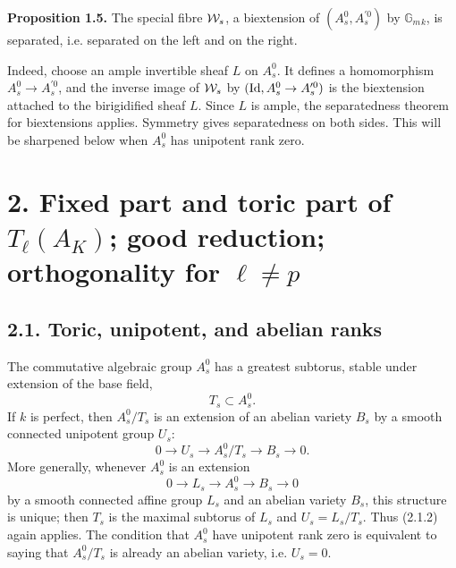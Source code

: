 \documentclass[11pt]{article}
\providecommand{\Gm}{\mathbb G_m}
\begin{document}
\textbf{Proposition 1.5.}  The special fibre \(\mathcal W_s\), a biextension of \((A_s^0,A_s^{\prime 0})\) by \(\Gm{}_k\), is separated, i.e. separated on the left and on the right.

Indeed, choose an ample invertible sheaf \(L\) on \(A_s^0\).  It defines a homomorphism \(A_s^0\to A_s^{\prime 0}\), and the inverse image of \(\mathcal W_s\) by \((\operatorname{Id},A_s^0\to A_s^{\prime 0})\) is the biextension attached to the birigidified sheaf \(L\).  Since \(L\) is ample, the separatedness theorem for biextensions applies.  Symmetry gives separatedness on both sides.  This will be sharpened below when \(A_s^0\) has unipotent rank zero.

\section*{2. Fixed part and toric part of \(T_\ell(A_K)\); good reduction; orthogonality for \(\ell\ne p\)}

\subsection*{2.1. Toric, unipotent, and abelian ranks}
The commutative algebraic group \(A_s^0\) has a greatest subtorus, stable under extension of the base field,
\begin{equation}\tag{2.1.1}
 T_s\subset A_s^0.
\end{equation}
If \(k\) is perfect, then \(A_s^0/T_s\) is an extension of an abelian variety \(B_s\) by a smooth connected unipotent group \(U_s\):
\begin{equation}\tag{2.1.2}
 0\longrightarrow U_s\longrightarrow A_s^0/T_s\longrightarrow B_s\longrightarrow0.
\end{equation}
More generally, whenever \(A_s^0\) is an extension
\begin{equation}\tag{2.1.3}
 0\longrightarrow L_s\longrightarrow A_s^0\longrightarrow B_s\longrightarrow0
\end{equation}
by a smooth connected affine group \(L_s\) and an abelian variety \(B_s\), this structure is unique; then \(T_s\) is the maximal subtorus of \(L_s\) and \(U_s=L_s/T_s\).  Thus (2.1.2) again applies.  The condition that \(A_s^0\) have unipotent rank zero is equivalent to saying that \(A_s^0/T_s\) is already an abelian variety, i.e. \(U_s=0\).
\end{document}

